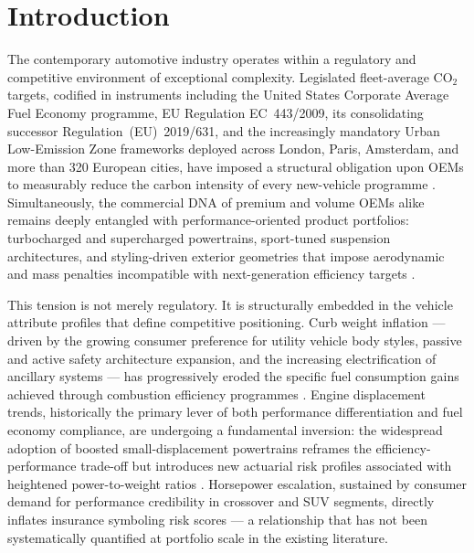 \documentclass[conference]{IEEEtran}
\begin{document}
\section{Introduction}

The contemporary automotive industry operates within a regulatory and
competitive environment of exceptional complexity. Legislated fleet-average
CO$_2$ targets, codified in instruments including the United States
Corporate Average Fuel Economy programme, EU Regulation EC~443/2009,
its consolidating successor Regulation~(EU)~2019/631, and the
increasingly mandatory Urban Low-Emission Zone frameworks deployed across
London, Paris, Amsterdam, and more than 320 European cities, have
imposed a structural obligation upon OEMs to measurably reduce the
carbon intensity of every new-vehicle programme \cite{icct2022cafe,
eu443_2009, zhu2020lowemission}. Simultaneously, the commercial DNA of
premium and volume OEMs alike remains deeply entangled with
performance-oriented product portfolios: turbocharged and supercharged
powertrains, sport-tuned suspension architectures, and styling-driven
exterior geometries that impose aerodynamic and mass penalties
incompatible with next-generation efficiency targets \cite{sae2021downsizing}.

This tension is not merely regulatory. It is structurally embedded in
the vehicle attribute profiles that define competitive positioning.
Curb weight inflation — driven by the growing consumer preference for
utility vehicle body styles, passive and active safety architecture
expansion, and the increasing electrification of ancillary systems —
has progressively eroded the specific fuel consumption gains achieved
through combustion efficiency programmes \cite{lutsey2010compounding}.
Engine displacement trends, historically the primary lever of both
performance differentiation and fuel economy compliance, are undergoing
a fundamental inversion: the widespread adoption of boosted
small-displacement powertrains reframes the efficiency-performance
trade-off but introduces new actuarial risk profiles associated with
heightened power-to-weight ratios \cite{bandivadekar2011beyond}.
Horsepower escalation, sustained by consumer demand for performance
credibility in crossover and SUV segments, directly inflates insurance
symboling risk scores — a relationship that has not been systematically
quantified at portfolio scale in the existing literature.
\end{document}
